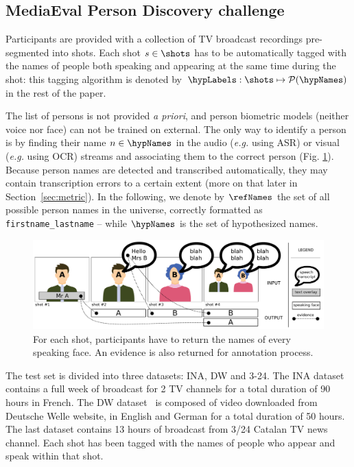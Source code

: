 \subsection{MediaEval Person Discovery challenge}

 Participants are provided with a collection of TV broadcast recordings pre-segmented into shots.
Each shot $s \in \shots$ has to be automatically tagged with the names of people both speaking and appearing at the same time during the shot: this tagging algorithm is denoted by $\hypLabels : \shots \mapsto \mathcal{P}(\hypNames)$ in the rest of the paper.

The list of persons is not provided \emph{a priori}, and person biometric models (neither voice nor face) can not be trained on external. The only way to identify a person is by finding their name $n \in \hypNames$ in the audio (\emph{e.g.} using ASR) or visual (\emph{e.g.} using OCR) streams and associating them to the correct person (Fig. \ref{fig:evidence}). %
Because person names are detected and transcribed automatically, they may contain transcription errors to a certain extent (more on that later in Section~\ref{sec:metric}). In the following, we denote by $\refNames$ the set of all possible person names in the universe, correctly formatted as \texttt{firstname\_lastname} -- while $\hypNames$ is the set of hypothesized names.

\begin{figure}[!htb]
 \centering
 \includegraphics[width=1.\linewidth]{evidence.pdf}

 \caption{For each shot, participants have to return the names of every speaking face. An evidence is also returned for annotation process.}
 \label{fig:evidence}
\end{figure}

 The test set is divided into three datasets: INA, DW and 3-24. The INA dataset contains a full week of broadcast for 2 TV channels for a total duration of 90 hours in French. The DW dataset~\cite{EUMSSI} is composed of video downloaded from Deutsche Welle website, in English and German for a total duration of 50 hours. The last dataset contains 13 hours of broadcast from 3/24 Catalan TV news channel. Each shot has been tagged with the names of people who appear and speak within that shot.
%

